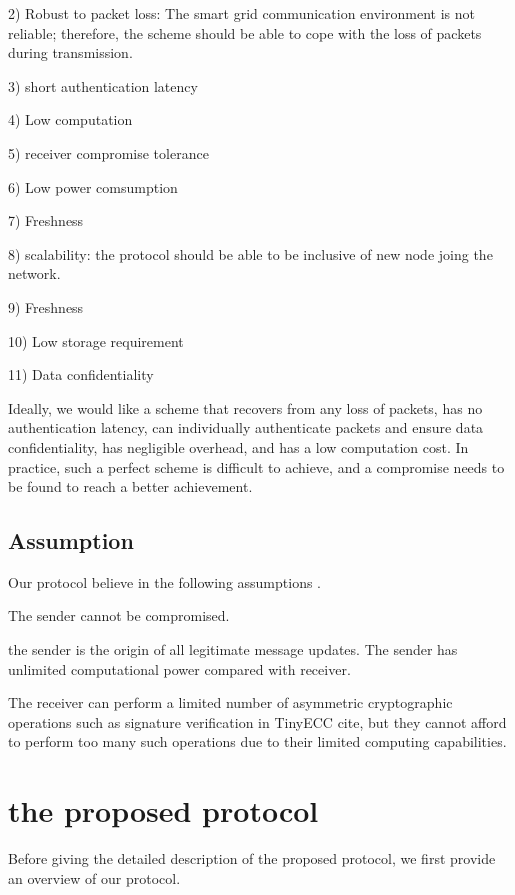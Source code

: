 \documentclass[lnicst,sechang,a4paper]{svmultln}
\begin{document}
 	2) Robust to packet loss: The smart grid communication environment is not reliable; therefore, the scheme should be able to cope with the loss of packets during transmission.
 	
 	3) short authentication latency
 	
 	4) Low computation 
 	
 	5) receiver compromise tolerance
 	
 	6) Low power comsumption 
 	
 	7) Freshness
 	
 	8) scalability: the protocol should be able to be inclusive of new node joing the network.
 	
 	9) Freshness
 	
 	10) Low storage requirement
 	
 	11) Data confidentiality
 	
 	Ideally, we would like a scheme that recovers from any loss of packets, has no authentication latency, can individually authenticate packets and ensure data confidentiality, has negligible overhead, and has a low computation cost. In practice, such a perfect scheme is difficult to achieve, and a compromise needs to be found to reach a better achievement.
 	
\subsection{Assumption}
Our protocol believe in the following assumptions . 

The sender cannot be compromised.

the sender is the origin of all legitimate message updates. The sender has unlimited computational power compared with receiver.

The receiver can perform a limited number of asymmetric cryptographic operations such as signature verification in TinyECC cite{}, but they cannot afford to perform too many such operations due to their limited computing capabilities.

\section{the proposed protocol}
Before giving the detailed description of the proposed protocol, we first provide an overview of our protocol.
\end{document}
